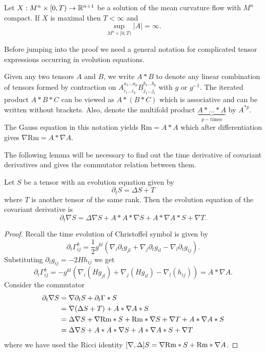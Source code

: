 \begin{thm}\label{longtimeexistence}
    Let $ X: M^{n} \times [0, T) \to \mathbb{R}^{n+1} $ be a solution of the mean curvature flow with $ M^{n} $ compact. If $ X $ is maximal then $ T< \infty $ and 
    \[ \sup_{M^{n} \times [0,T)} |A| = \infty.\]
\end{thm}

Before jumping into the proof we need a general notation for complicated tensor expressions occurring in evolution equations. 
\begin{defn}
    Given any two tensors $ A $ and $ B $, we write $ A * B $ to denote any linear combination of tensors formed by contraction on $ A_{i_{1} \dots i_{k}}^{a_{1} \dots a_{p}}B_{j_{1} \dots j_{l}}^{b_{1} \dots b_{q}} $ with $ g $ or $ g^{-1} $. The iterated product $ A * B * C $ can be viewed as $ A * (B * C) $ which is associative and can be written without brackets. Also, denote the multifold product $ \underbrace{A * \dots * A}_{p-\text{times}}$ by $ A^{*p} $. The Gauss equation in this notation yields $ \text{Rm} = A * A $ which after differentiation gives $ \nabla \text{Rm} = A * \nabla A $. 
\end{defn}

The following lemma will be necessary to find out the time derivative of covariant derivatives and gives the commutator relation between them. 
\begin{lemma}
    Let $ S $ be a tensor with an evolution equation given by 
    \[ \partial_{t} S = \Delta S + T \]
    where $ T $ is another tensor of the same rank. Then the evolution equation of the covariant derivative is \begin{equation}
        \partial_{t}\nabla S = \Delta \nabla S + A * A  * \nabla S + A * \nabla A * S + \nabla T.
    \end{equation}
\end{lemma}
\begin{proof}
    Recall the time evolution of Christoffel symbol is given by     
    \begin{equation}
        \partial_{t}\Gamma_{ij}^{k} = \frac{1}{2}g^{kl}(\nabla_{i}\partial_{t}g_{jl}+ \nabla_{j}\partial_{t}g_{il}-\nabla_{l}\partial_{t}g_{ij}).
    \end{equation}
    Substituting $ \partial_{t}g_{ij} = -2Hh_{ij} $ we get 
    \[ \partial_{t}\Gamma_{ij}^{k} = -g^{kl}(\nabla_{i}(Hg_{jl})+ \nabla_{j}(Hg_{il})-\nabla_{l}(h_{ij})) = A * \nabla A. \]
    Consider the commutator \begin{align*}
        \partial_{t}\nabla S & = \nabla \partial_{t}S + \partial_{t}\Gamma *S \\
        & = \nabla(\Delta S+T) + A * \nabla A * S \\
        & = \Delta \nabla S + \nabla \text{Rm} * S + \text{Rm} * \nabla S  + \nabla T + A * \nabla A * S \\
        & = \Delta \nabla S + A * A  * \nabla S + A * \nabla A * S + \nabla T
    \end{align*}
    where we have used the Ricci identity $ [\nabla, \Delta]S = \nabla \text{Rm} * S + \text{Rm} * \nabla A $.
\end{proof}



